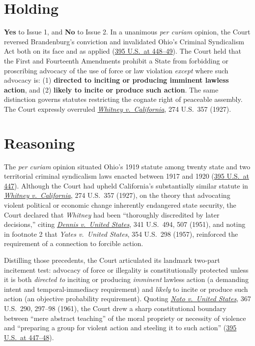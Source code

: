 \documentclass[12pt]{article}
\begin{document}
\section{Holding}

\textbf{Yes} to Issue 1, and \textbf{No} to Issue 2. In a unanimous \emph{per curiam} opinion, the Court reversed Brandenburg's conviction and invalidated Ohio's Criminal Syndicalism Act both on its face and as applied (\href{https://supreme.justia.com/cases/federal/us/395/444/}{395 U.S.\ at 448--49}). The Court held that the First and Fourteenth Amendments prohibit a State from forbidding or proscribing advocacy of the use of force or law violation \emph{except} where such advocacy is: (1) \textbf{directed to inciting or producing imminent lawless action}, and (2) \textbf{likely to incite or produce such action}. The same distinction governs statutes restricting the cognate right of peaceable assembly. The Court expressly overruled \href{https://supreme.justia.com/cases/federal/us/274/357/}{\emph{Whitney v.\ California}}, 274 U.S.\ 357 (1927).

\section{Reasoning}

The \emph{per curiam} opinion situated Ohio's 1919 statute among twenty state and two territorial criminal syndicalism laws enacted between 1917 and 1920 (\href{https://supreme.justia.com/cases/federal/us/395/444/}{395 U.S.\ at 447}). Although the Court had upheld California's substantially similar statute in \href{https://supreme.justia.com/cases/federal/us/274/357/}{\emph{Whitney v.\ California}}, 274 U.S.\ 357 (1927), on the theory that advocating violent political or economic change inherently endangered state security, the Court declared that \emph{Whitney} had been ``thoroughly discredited by later decisions,'' citing \href{https://supreme.justia.com/cases/federal/us/341/494/}{\emph{Dennis v.\ United States}}, 341 U.S.\ 494, 507 (1951), and noting in footnote 2 that \emph{Yates v.\ United States}, 354 U.S.\ 298 (1957), reinforced the requirement of a connection to forcible action.

Distilling those precedents, the Court articulated its landmark two-part incitement test: advocacy of force or illegality is constitutionally protected unless it is both \emph{directed to} inciting or producing \emph{imminent} lawless action (a demanding intent and temporal-immediacy requirement) and \emph{likely} to incite or produce such action (an objective probability requirement). Quoting \href{https://supreme.justia.com/cases/federal/us/367/290/}{\emph{Noto v.\ United States}}, 367 U.S.\ 290, 297--98 (1961), the Court drew a sharp constitutional boundary between ``mere abstract teaching'' of the moral propriety or necessity of violence and ``preparing a group for violent action and steeling it to such action'' (\href{https://supreme.justia.com/cases/federal/us/395/444/}{395 U.S.\ at 447--48}).
\end{document}
